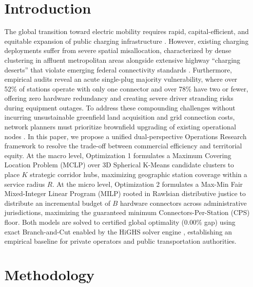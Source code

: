 \documentclass[conference]{IEEEtran}
\begin{document}
\section{Introduction}
The global transition toward electric mobility requires rapid, capital-efficient, and equitable expansion of public charging infrastructure \cite{huang2020ev, he2013deploying}. However, existing charging deployments suffer from severe spatial misallocation, characterized by dense clustering in affluent metropolitan areas alongside extensive highway ``charging deserts'' that violate emerging federal connectivity standards \cite{fhwa2022nevi}. Furthermore, empirical audits reveal an acute single-plug majority vulnerability, where over 52\% of stations operate with only one connector and over 78\% have two or fewer, offering zero hardware redundancy and creating severe driver stranding risks during equipment outages. To address these compounding challenges without incurring unsustainable greenfield land acquisition and grid connection costs, network planners must prioritize brownfield upgrading of existing operational nodes \cite{he2013deploying}. In this paper, we propose a unified dual-perspective Operations Research framework to resolve the trade-off between commercial efficiency and territorial equity. At the macro level, Optimization 1 formulates a Maximum Covering Location Problem (MCLP) \cite{church1974maximal, daskin2013network} over 3D Spherical K-Means candidate clusters \cite{banerjee2005clustering} to place $K$ strategic corridor hubs, maximizing geographic station coverage within a service radius $R$. At the micro level, Optimization 2 formulates a Max-Min Fair Mixed-Integer Linear Program (MILP) rooted in Rawlsian distributive justice \cite{rawls1971theory, ogryczak2014fair} to distribute an incremental budget of $B$ hardware connectors across administrative jurisdictions, maximizing the guaranteed minimum Connectors-Per-Station (CPS) floor. Both models are solved to certified global optimality (0.00\% gap) using exact Branch-and-Cut enabled by the HiGHS solver engine \cite{huangfu2018parallelizing}, establishing an empirical baseline for private operators and public transportation authorities.

\section{Methodology}
\end{document}
